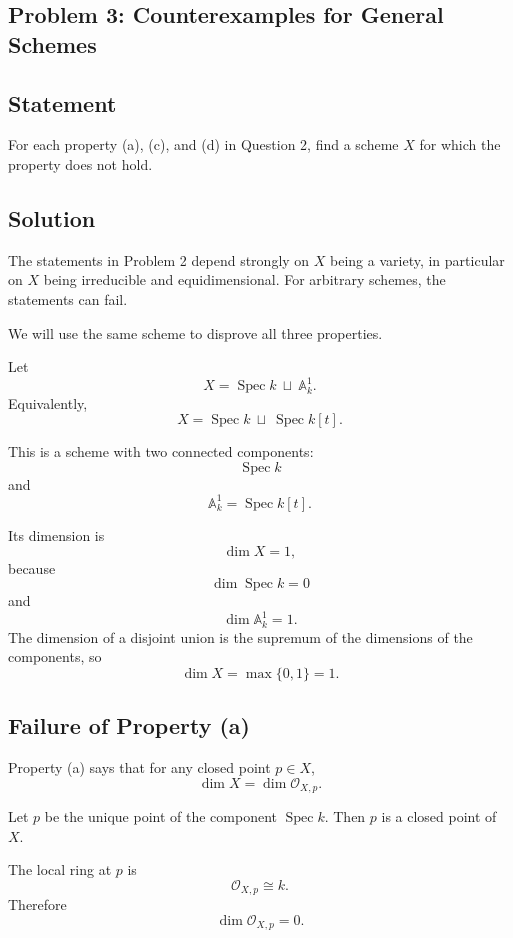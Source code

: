 
\subsection*{Problem 3: Counterexamples for General Schemes}

\subsection*{Statement}

For each property (a), (c), and (d) in Question 2, find a scheme \(X\) for which the property does not hold.

\subsection*{Solution}

The statements in Problem 2 depend strongly on \(X\) being a variety, in particular on \(X\) being irreducible and equidimensional. For arbitrary schemes, the statements can fail.

We will use the same scheme to disprove all three properties.

Let
\[
X=\operatorname{Spec} k\ \sqcup\ \mathbb A^1_k.
\]
Equivalently,
\[
X=\operatorname{Spec} k\ \sqcup\ \operatorname{Spec} k[t].
\]

This is a scheme with two connected components:
\[
\operatorname{Spec} k
\]
and
\[
\mathbb A^1_k=\operatorname{Spec} k[t].
\]

Its dimension is
\[
\dim X=1,
\]
because
\[
\dim \operatorname{Spec} k=0
\]
and
\[
\dim \mathbb A^1_k=1.
\]
The dimension of a disjoint union is the supremum of the dimensions of the components, so
\[
\dim X=\max\{0,1\}=1.
\]

\subsection{Failure of Property (a)}

Property (a) says that for any closed point \(p\in X\),
\[
\dim X=\dim \mathcal O_{X,p}.
\]

Let \(p\) be the unique point of the component \(\operatorname{Spec} k\). Then \(p\) is a closed point of \(X\).

The local ring at \(p\) is
\[
\mathcal O_{X,p}\cong k.
\]
Therefore
\[
\dim \mathcal O_{X,p}=0.
\]


